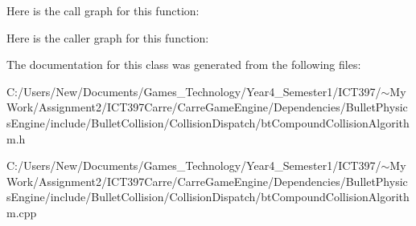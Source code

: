 Here is the call graph for this function:

Here is the caller graph for this function:

The documentation for this class was generated from the following files:\begin{CompactItemize}
\item 
C:/Users/New/Documents/Games\_\-Technology/Year4\_\-Semester1/ICT397/$\sim$My Work/Assignment2/ICT397Carre/CarreGameEngine/Dependencies/BulletPhysicsEngine/include/BulletCollision/CollisionDispatch/btCompoundCollisionAlgorithm.h\item 
C:/Users/New/Documents/Games\_\-Technology/Year4\_\-Semester1/ICT397/$\sim$My Work/Assignment2/ICT397Carre/CarreGameEngine/Dependencies/BulletPhysicsEngine/include/BulletCollision/CollisionDispatch/btCompoundCollisionAlgorithm.cpp\end{CompactItemize}
